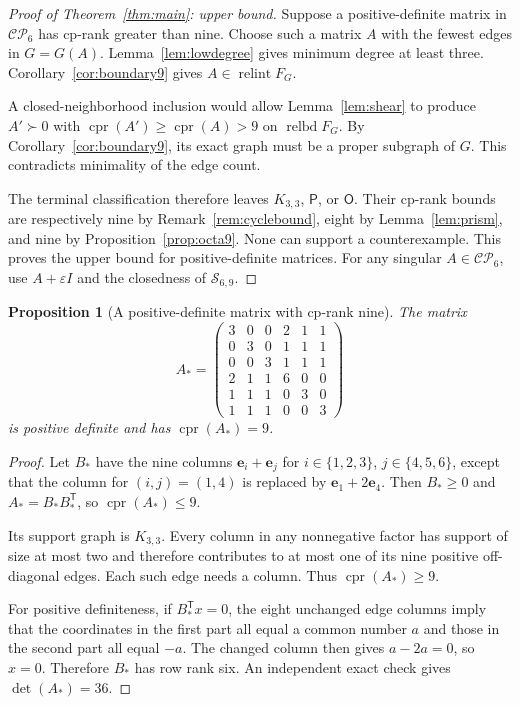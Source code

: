 \documentclass[11pt,a4paper]{article}
\newtheorem{proposition}[theorem]{Proposition}
\theoremstyle{definition}
\newcommand{\CP}{\mathcal{CP}}
\newcommand{\OO}{\mathsf{O}}
\newcommand{\PP}{\mathsf{P}}
\DeclareMathOperator{\cpr}{cpr}
\DeclareMathOperator{\relint}{relint}
\DeclareMathOperator{\relbd}{relbd}
\newcommand{\ee}{\mathbf e}
\newcommand{\T}{\mathsf T}
\begin{document}
\begin{proof}[Proof of Theorem~\ref{thm:main}: upper bound]
Suppose a positive-definite matrix in $\CP_6$ has cp-rank greater than nine. Choose such a matrix $A$ with the fewest edges in $G=G(A)$. Lemma~\ref{lem:lowdegree} gives minimum degree at least three. Corollary~\ref{cor:boundary9} gives $A\in\relint F_G$.

A closed-neighborhood inclusion would allow Lemma~\ref{lem:shear} to produce $A'\succ0$ with $\cpr(A')\geq\cpr(A)>9$ on $\relbd F_G$. By Corollary~\ref{cor:boundary9}, its exact graph must be a proper subgraph of $G$. This contradicts minimality of the edge count.

The terminal classification therefore leaves $K_{3,3}$, $\PP$, or $\OO$. Their cp-rank bounds are respectively nine by Remark~\ref{rem:cyclebound}, eight by Lemma~\ref{lem:prism}, and nine by Proposition~\ref{prop:octa9}. None can support a counterexample. This proves the upper bound for positive-definite matrices. For any singular $A\in\CP_6$, use $A+\varepsilon I$ and the closedness of $\mathcal S_{6,9}$.
\end{proof}

\begin{proposition}[A positive-definite matrix with cp-rank nine]\label{prop:sharp}
The matrix
\begin{equation}\label{eq:sharpA}
 A_* = \begin{pmatrix}
 3&0&0&2&1&1\\
 0&3&0&1&1&1\\
 0&0&3&1&1&1\\
 2&1&1&6&0&0\\
 1&1&1&0&3&0\\
 1&1&1&0&0&3
 \end{pmatrix}
\end{equation}
is positive definite and has $\cpr(A_*)=9$.
\end{proposition}
\begin{proof}
Let $B_*$ have the nine columns $\ee_i+\ee_j$ for $i\in\{1,2,3\}$, $j\in\{4,5,6\}$, except that the column for $(i,j)=(1,4)$ is replaced by $\ee_1+2\ee_4$. Then $B_*\geq0$ and $A_*=B_*B_*^{\T}$, so $\cpr(A_*)\leq9$.

Its support graph is $K_{3,3}$. Every column in any nonnegative factor has support of size at most two and therefore contributes to at most one of its nine positive off-diagonal edges. Each such edge needs a column. Thus $\cpr(A_*)\geq9$.

For positive definiteness, if $B_*^{\T}x=0$, the eight unchanged edge columns imply that the coordinates in the first part all equal a common number $a$ and those in the second part all equal $-a$. The changed column then gives $a-2a=0$, so $x=0$. Therefore $B_*$ has row rank six. An independent exact check gives $\det(A_*)=36$.
\end{proof}
\end{document}
